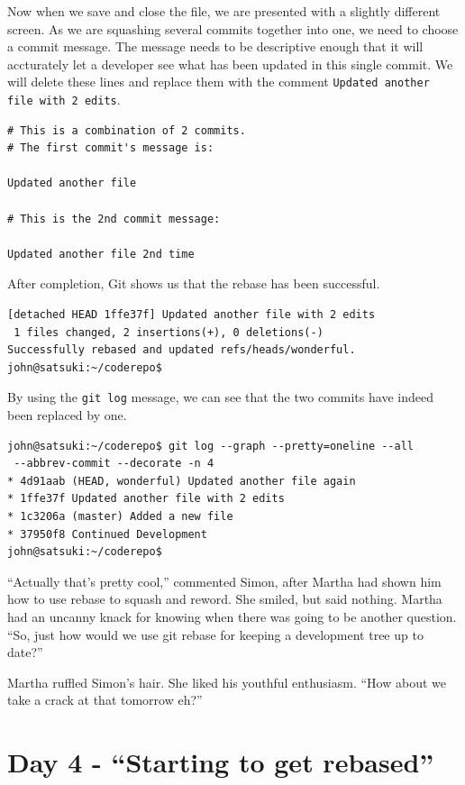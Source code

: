 Now when we save and close the file, we are presented with a slightly different screen.
As we are squashing several commits together into one, we need to choose a commit message.
The message needs to be descriptive enough that it will accturately let a developer see what has been updated in this single commit.
We will delete these lines and replace them with the comment \texttt{Updated another file with 2 edits}.

\begin{Verbatim}
# This is a combination of 2 commits.
# The first commit's message is:

Updated another file

# This is the 2nd commit message:

Updated another file 2nd time
\end{Verbatim}

After completion, Git shows us that the rebase has been successful.

\begin{Verbatim}
[detached HEAD 1ffe37f] Updated another file with 2 edits
 1 files changed, 2 insertions(+), 0 deletions(-)
Successfully rebased and updated refs/heads/wonderful.
john@satsuki:~/coderepo$
\end{Verbatim}

By using the \texttt{git log} message, we can see that the two commits have indeed been replaced by one.

\begin{Verbatim}
john@satsuki:~/coderepo$ git log --graph --pretty=oneline --all
 --abbrev-commit --decorate -n 4
* 4d91aab (HEAD, wonderful) Updated another file again
* 1ffe37f Updated another file with 2 edits
* 1c3206a (master) Added a new file
* 37950f8 Continued Development
john@satsuki:~/coderepo$
\end{Verbatim}

\begin{trenches}
``Actually that's pretty cool,'' commented Simon, after Martha had shown him how to use rebase to squash and reword.
She smiled, but said nothing.
Martha had an uncanny knack for knowing when there was going to be another question.
``So, just how would we use git rebase for keeping a development tree up to date?''

Martha ruffled Simon's hair.
She liked his youthful enthusiasm.
``How about we take a crack at that tomorrow eh?''
\end{trenches}

\section{Day 4 - ``Starting to get rebased''}
